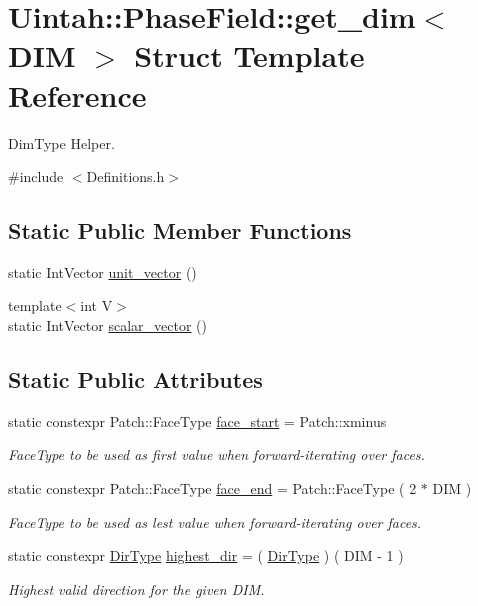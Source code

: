 \hypertarget{structUintah_1_1PhaseField_1_1get__dim}{}\section{Uintah\+:\+:Phase\+Field\+:\+:get\+\_\+dim$<$ D\+IM $>$ Struct Template Reference}
\label{structUintah_1_1PhaseField_1_1get__dim}


Dim\+Type Helper.  




{\ttfamily \#include $<$Definitions.\+h$>$}

\subsection*{Static Public Member Functions}
\begin{DoxyCompactItemize}
\item 
static Int\+Vector \hyperlink{structUintah_1_1PhaseField_1_1get__dim_adf79b3a3a658519c8516b6899fb9d588}{unit\+\_\+vector} ()
\item 
{\footnotesize template$<$int V$>$ }\\static Int\+Vector \hyperlink{structUintah_1_1PhaseField_1_1get__dim_a23acb158beb7f5bc2092b0162ffdcf2a}{scalar\+\_\+vector} ()
\end{DoxyCompactItemize}
\subsection*{Static Public Attributes}
\begin{DoxyCompactItemize}
\item 
static constexpr Patch\+::\+Face\+Type \hyperlink{structUintah_1_1PhaseField_1_1get__dim_afd8fb64919d3c885e76d9f5f4484dfcf}{face\+\_\+start} = Patch\+::xminus
\begin{DoxyCompactList}\small\item\em Face\+Type to be used as first value when forward-\/iterating over faces. \end{DoxyCompactList}\item 
static constexpr Patch\+::\+Face\+Type \hyperlink{structUintah_1_1PhaseField_1_1get__dim_a7efaa82a02b8d74fe1c84bc41938bc6c}{face\+\_\+end} = Patch\+::\+Face\+Type ( 2 $\ast$ D\+IM )
\begin{DoxyCompactList}\small\item\em Face\+Type to be used as lest value when forward-\/iterating over faces. \end{DoxyCompactList}\item 
static constexpr \hyperlink{namespaceUintah_1_1PhaseField_a94555da848596a419ae2c0e32649e1dc}{Dir\+Type} \hyperlink{structUintah_1_1PhaseField_1_1get__dim_a5cccf47293a967c562447e0aa5fdbb43}{highest\+\_\+dir} = ( \hyperlink{namespaceUintah_1_1PhaseField_a94555da848596a419ae2c0e32649e1dc}{Dir\+Type} ) ( D\+IM -\/ 1 )
\begin{DoxyCompactList}\small\item\em Highest valid direction for the given D\+IM. \end{DoxyCompactList}\end{DoxyCompactItemize}


